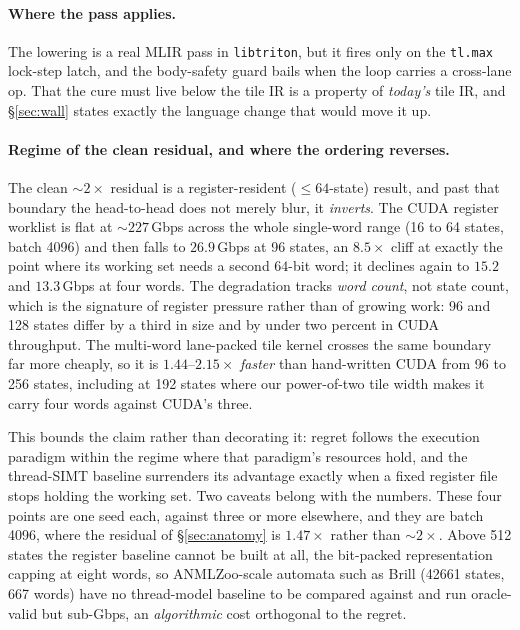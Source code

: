 \documentclass[sigplan,screen,review]{acmart}
\begin{document}
\paragraph{Where the pass applies.} The lowering is a real MLIR pass in \texttt{libtriton},
but it fires only on the \texttt{tl.max} lock-step latch, and the body-safety guard bails
when the loop carries a cross-lane op. That the cure must live below the tile IR is a
property of \emph{today's} tile IR, and \S\ref{sec:wall} states exactly the language change
that would move it up.

\paragraph{Regime of the clean residual, and where the ordering reverses.} The clean
${\sim}2\times$ residual is a register-resident ($\le 64$-state) result, and past that
boundary the head-to-head does not merely blur, it \emph{inverts}. The CUDA register
worklist is flat at ${\sim}227$\,Gbps across the whole single-word range (16 to 64 states,
batch 4096) and then falls to $26.9$\,Gbps at 96 states, an $8.5\times$ cliff at exactly the
point where its working set needs a second $64$-bit word; it declines again to $15.2$ and
$13.3$\,Gbps at four words. The degradation tracks \emph{word count}, not state count,
which is the signature of register pressure rather than of growing work: 96 and 128 states
differ by a third in size and by under two percent in CUDA throughput. The
multi-word lane-packed tile kernel crosses the same boundary far more cheaply, so it is
$1.44$--$2.15\times$ \emph{faster} than hand-written CUDA from 96 to 256 states, including
at 192 states where our power-of-two tile width makes it carry four words against CUDA's
three.

This bounds the claim rather than decorating it: regret follows the execution paradigm
within the regime where that paradigm's resources hold, and the thread-SIMT baseline
surrenders its advantage exactly when a fixed register file stops holding the working set.
Two caveats belong with the numbers. These four points are one seed each, against three or
more elsewhere, and they are batch 4096, where the residual of \S\ref{sec:anatomy} is
$1.47\times$ rather than ${\sim}2\times$. Above 512 states the register baseline cannot be
built at all, the bit-packed representation capping at eight words, so ANMLZoo-scale
automata such as Brill (42661 states, 667 words) have no thread-model baseline to be
compared against and run oracle-valid but sub-Gbps, an \emph{algorithmic} cost orthogonal
to the regret.
\end{document}
